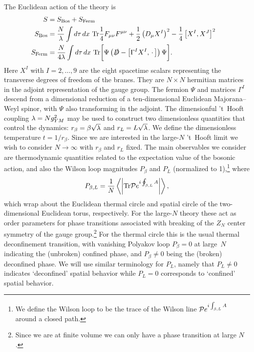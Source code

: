 The Euclidean action of the theory is
\begin{align}
  S & = S_{\text{Bos}} + S_{\text{Ferm}} \cr
  S_{\text{Bos}}  & = \frac{N}{\lam} \int d\tau\, dx\ \Tr{\frac{1}{4}F_{\mu\nu}F^{\mu\nu} + \frac{1}{2}\left(D_{\mu} X^I\right)^2 - \frac{1}{4}\left[X^I, X^J\right]^2} \cr
  S_{\text{Ferm}} & = \frac{N}{4\lam} \int d\tau\, dx\ \text{Tr}\bigg[\Psi \left(\slashed{D} - \left[\Gamma^I X^I, \, \cdot \,\right]\right) \Psi\bigg].       \label{eq:SYMaction}
\end{align}
Here $X^I$ with $I = 2, \ldots, 9$ are the eight spacetime scalars representing the transverse degrees of freedom of the branes.
They are $N\times N$ hermitian matrices in the adjoint representation of the gauge group.
The fermion $\Psi$ and matrices $\Gamma^I$ descend from a dimensional reduction of a ten-dimensional Euclidean Majorana--Weyl spinor, with $\Psi$ also transforming in the adjoint.
The dimensionful 't~Hooft coupling $\lambda = N g_{YM}^2$ may be used to construct two dimensionless quantities that control the dynamics: $r_{\beta} = \beta \sqrt{\lambda}$ and $r_L = L \sqrt{\lambda}$.
We define the dimensionless temperature $t = 1 / r_{\beta}$.
Since we are interested in the large-$N$ 't~Hooft limit we wish to consider $N \to \infty$ with $r_{\beta}$ and $r_L$ fixed.
The main observables we consider are thermodynamic quantities related to the expectation value of the bosonic action, and also the Wilson loop magnitudes $P_{\beta}$ and $P_L$ (normalized to 1),\footnote{We define the Wilson loop to be the trace of the Wilson line $\mathcal P e^{i\int_{\beta, L} A}$ around a closed path.} where
\begin{equation}
  \label{eq:Pdefn}
  P_{\beta, L} = \frac{1}{N} \left\langle \left| \mathrm{Tr}{\mathcal P e^{i\oint_{\beta, L} A}} \right| \right\rangle,
\end{equation}
which wrap about the Euclidean thermal circle and spatial circle of the two-dimensional Euclidean torus, respectively.
For the large-$N$ theory these act as order parameters for phase transitions associated with breaking of the $Z_N$ center symmetry of the gauge group.\footnote{Since we are at finite volume we can only have a phase transition at large $N$.}
For the thermal circle this is the usual thermal deconfinement transition, with vanishing Polyakov loop $P_{\beta} = 0$ at large~$N$ indicating the (unbroken) confined phase, and $P_{\beta} \ne 0$ being the (broken) deconfined phase.
We will use similar terminology for $P_L$, namely that $P_L \ne 0$ indicates `deconfined' spatial behavior while $P_L = 0$ corresponds to `confined' spatial behavior.

